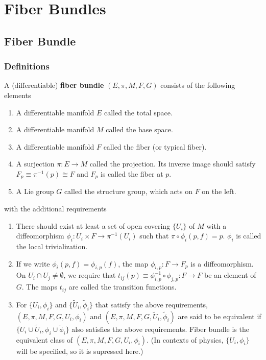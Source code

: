 \documentclass[10pt]{article}
\begin{document}
\clearpage
\section{Fiber Bundles}

\subsection{Fiber Bundle}
\subsubsection{Definitions}
\begin{definition}
    A (differentiable) \textbf{fiber bundle} $(E,\pi,M,F,G)$ consists of the following elements 
    \begin{enumerate}
        \item A differentiable manifold $E$ called the total space. 
        \item A differentiable manifold $M$ called the base space.
        \item A differentiable manifold $F$ called the fiber (or typical fiber).
        \item A surjection $\pi:E\to M$ called the projection.
              Its inverse image should satisfy $F_p\equiv\pi^{-1}(p)\cong F$ and $F_p$ is called the fiber at $p$.
        \item A Lie group $G$ called the structure group, which acts on $F$ on the left.
    \end{enumerate}
    with the additional requirements
    \begin{enumerate}
        \item There should exist at least a set of open covering $\{U_i\}$ of $M$ with a diffeomorphism $\phi_i:U_i\times F\to\pi^{-1}(U_i)$ such that $\pi\circ\phi_i(p,f)=p$. 
              $\phi_i$ is called the local trivialization.
        \item If we write $\phi_i(p,f)=\phi_{i,p}(f)$, the map $\phi_{i,p}:F\to F_p$ is a diffeomorphism. 
              On $U_i\cap U_j\neq\emptyset$, we require that $t_{ij}(p)\equiv\phi^{-1}_{i,p}\circ\phi_{j,p}:F\to F$ be an element of $G$.
              The maps $t_{ij}$ are called the transition functions.
        \item For $\{U_i,\phi_i\}$ and $\{\widetilde{U}_i,\widetilde{\phi}_i\}$ that satisfy the above requirements, $(E,\pi,M,F,G,U_i,\phi_i)$ and $(E,\pi,M,F,G,\widetilde{U}_i,\widetilde{\phi}_i)$ are said to be equivalent if $\{U_i\cup \widetilde{U}_i,\phi_i\cup\widetilde{\phi}_i\}$ also satisfies the above requirements.
              Fiber bundle is the equivalent class of $(E,\pi,M,F,G,U_i,\phi_i)$. (In contexts of physics, $\{U_i,\phi_i\}$ will be specified, so it is supressed here.)
    \end{enumerate}
\end{definition}
\end{document}
